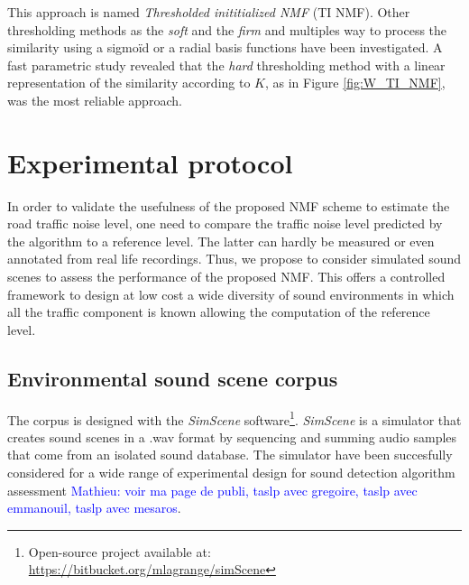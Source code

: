 \documentclass[twocolumn,a4paper,10pt]{article}
\newcommand{\ml}[1]{\textcolor{blue}{ Mathieu: #1}}
\begin{document}
This approach is named \textit{Thresholded inititialized NMF} (TI NMF). Other thresholding methods as the \textit{soft} \cite{donoho1995noising} and the \textit{firm} \cite{fornasier2008iterative} and multiples way to process the similarity using a sigmoïd or a radial basis functions have been investigated. A fast parametric study revealed that the \textit{hard} thresholding method  with a linear representation of the similarity according to $K$, as in  Figure \ref{fig:W_TI_NMF}, was the most reliable approach.

\section{Experimental protocol}\label{part:protocol}

In order to validate the usefulness of the proposed NMF scheme to estimate the road traffic noise level, one need to compare the traffic noise level predicted by the algorithm to a reference level. The latter can hardly be measured or even annotated from real life recordings. Thus,  we propose to consider simulated sound scenes to assess the performance of the proposed NMF. This offers a controlled framework to design at low cost a wide diversity of sound environments in which all the traffic component is known allowing the computation of the reference level. %

\subsection{Environmental sound scene corpus}

The corpus is designed with the \textit{SimScene} software\footnote{Open-source project available at: \url{https://bitbucket.org/mlagrange/simScene}}. \textit{SimScene} \cite{rossignol_simscene:_2015} is a simulator that creates sound scenes in a .wav format by sequencing and summing audio samples that come from an isolated sound database. The simulator have been succesfully considered for a wide range of experimental design for sound detection algorithm assessment \ml{voir ma page de publi, taslp avec gregoire, taslp avec emmanouil, taslp avec mesaros}.
\end{document}
